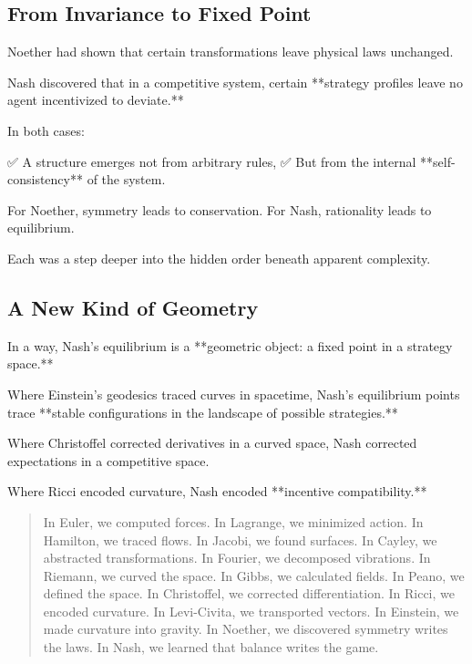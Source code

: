 \bigskip

\subsection*{From Invariance to Fixed Point}

Noether had shown that certain transformations leave physical laws unchanged.

Nash discovered that in a competitive system, certain **strategy profiles leave no agent incentivized to deviate.**

In both cases:

✅ A structure emerges not from arbitrary rules,  
✅ But from the internal **self-consistency** of the system.

For Noether, symmetry leads to conservation.  
For Nash, rationality leads to equilibrium.

Each was a step deeper into the hidden order beneath apparent complexity.

\bigskip

\subsection*{A New Kind of Geometry}

In a way, Nash’s equilibrium is a **geometric object: a fixed point in a strategy space.**

Where Einstein’s geodesics traced curves in spacetime,  
Nash’s equilibrium points trace **stable configurations in the landscape of possible strategies.**

Where Christoffel corrected derivatives in a curved space,  
Nash corrected expectations in a competitive space.

Where Ricci encoded curvature,  
Nash encoded **incentive compatibility.**

\bigskip

\begin{quote}
In Euler, we computed forces.  
In Lagrange, we minimized action.  
In Hamilton, we traced flows.  
In Jacobi, we found surfaces.  
In Cayley, we abstracted transformations.  
In Fourier, we decomposed vibrations.  
In Riemann, we curved the space.  
In Gibbs, we calculated fields.  
In Peano, we defined the space.  
In Christoffel, we corrected differentiation.  
In Ricci, we encoded curvature.  
In Levi-Civita, we transported vectors.  
In Einstein, we made curvature into gravity.  
In Noether, we discovered symmetry writes the laws.  
In Nash, we learned that balance writes the game.
\end{quote}

